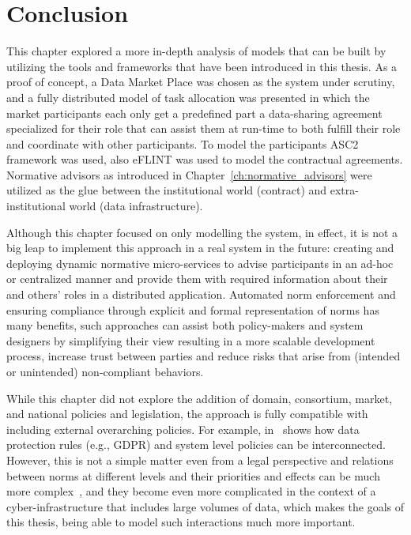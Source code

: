 \section{Conclusion}
This chapter explored a more in-depth analysis of models that can be built by utilizing the tools and frameworks that have been introduced in this thesis. As a proof of concept, a Data Market Place was chosen as the system under scrutiny, and a fully distributed model of task allocation was presented in which the market participants each only get a predefined part a data-sharing agreement specialized for their role that can assist them at run-time to both fulfill their role and coordinate with other participants. To model the participants ASC2 framework was used, also eFLINT was used to model the contractual agreements. Normative advisors as introduced in Chapter~\ref{ch:normative_advisors} were utilized as the glue between the institutional world (contract) and extra-institutional world (data infrastructure).

Although this chapter focused on only modelling the system, in effect, it is not a big leap to implement this approach in a real system in the future: creating and deploying dynamic normative micro-services to advise participants in an ad-hoc or centralized manner and provide them with required information about their and others' roles in a distributed application. Automated norm enforcement and ensuring compliance through explicit and formal representation of norms has many benefits, such approaches can assist both policy-makers and system designers by simplifying their view resulting in a more scalable development process, increase trust between parties and reduce risks that arise from (intended or unintended) non-compliant behaviors. 

While this chapter did not explore the addition of domain, consortium, market, and national policies and legislation, the approach is fully compatible with including external overarching policies. For example, in~\cite{binsbergen2021b} shows how data protection rules (e.g., GDPR) and system level policies can be interconnected. However, this is not a simple matter even from a legal perspective and relations between norms at different levels and their priorities and effects can be much more complex~\cite{hart2012concept}, and they become even more complicated in the context of a cyber-infrastructure that includes large volumes of data, which makes the goals of this thesis, being able to model such interactions much more important.